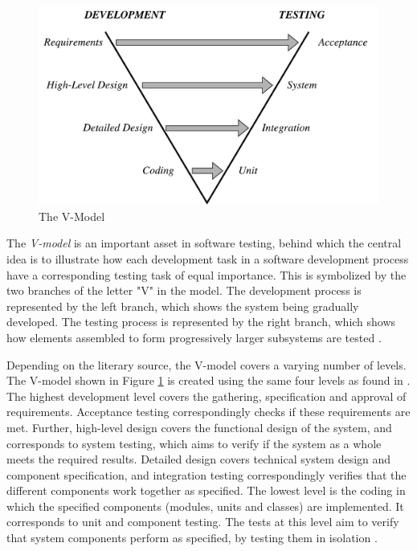 \begin{figure}[h]
    \centering
    \includegraphics[width=\textwidth]{figures/new/v_model.pdf}
    \caption{The V-Model}
    \label{fig.v-model}
\end{figure}


\noindent The \emph{V-model} is an important asset in software testing, behind which the central idea is to illustrate how each development task in a software development process have a corresponding testing task of equal importance. This is symbolized by the two branches of the letter "V" in the model. The development process is represented by the left branch, which shows the system being gradually developed. The testing process is represented by the right branch, which shows how elements assembled to form progressively larger subsystems are tested \cite{SoftwareTestingFoundations}.

Depending on the literary source, the V-model covers a varying number of levels. The V-model shown in Figure \ref{fig.v-model} is created using the same four levels as found in \cite{systematicSoftwareTesting}. The highest development level covers the gathering, specification and approval of requirements. Acceptance testing correspondingly checks if these requirements are met. Further, high-level design covers the functional design of the system, and corresponds to system testing, which aims to verify if the system as a whole meets the required results. Detailed design covers technical system design and component specification, and integration testing correspondingly verifies that the different components work together as specified. The lowest level is the coding in which the specified components (modules, units and classes) are implemented. It corresponds to unit and component testing. The tests at this level aim to verify that system components perform as specified, by testing them in isolation  \cite{SoftwareTestingFoundations}.


